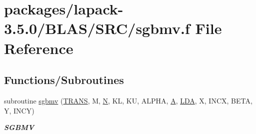 \hypertarget{lapack-3_85_80_2BLAS_2SRC_2sgbmv_8f}{}\section{packages/lapack-\/3.5.0/\+B\+L\+A\+S/\+S\+R\+C/sgbmv.f File Reference}
\label{lapack-3_85_80_2BLAS_2SRC_2sgbmv_8f}
\subsection*{Functions/\+Subroutines}
\begin{DoxyCompactItemize}
\item 
subroutine \hyperlink{group__single__blas__level2_ga1677e779273da82f0e61504afd07264e}{sgbmv} (\hyperlink{superlu__enum__consts_8h_a0c4e17b2d5cea33f9991ccc6a6678d62a1f61e3015bfe0f0c2c3fda4c5a0cdf58}{T\+R\+A\+N\+S}, M, \hyperlink{polmisc_8c_a0240ac851181b84ac374872dc5434ee4}{N}, K\+L, K\+U, A\+L\+P\+H\+A, \hyperlink{classA}{A}, \hyperlink{example__user_8c_ae946da542ce0db94dced19b2ecefd1aa}{L\+D\+A}, X, I\+N\+C\+X, B\+E\+T\+A, Y, I\+N\+C\+Y)
\begin{DoxyCompactList}\small\item\em {\bfseries S\+G\+B\+M\+V} \end{DoxyCompactList}\end{DoxyCompactItemize}
